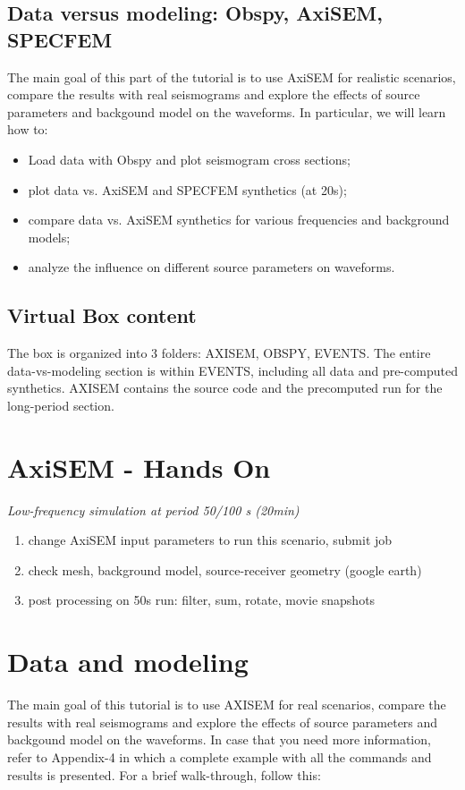 \documentclass{article}
\begin{document}
\subsection{Data versus modeling: Obspy, AxiSEM, SPECFEM}
The main goal of this part of the tutorial is to use AxiSEM for realistic scenarios, compare the 
results with real seismograms and explore the effects of source parameters and 
backgound model on the waveforms. In particular, we will learn how to:

\begin{itemize}
    \item Load data with Obspy and plot seismogram cross sections;
    \item plot data vs. AxiSEM and SPECFEM synthetics (at 20s);
    \item compare data vs. AxiSEM synthetics for various frequencies and background
          models;
    \item analyze the influence on different source parameters on waveforms.
\end{itemize}


\subsection{Virtual Box content}
The box is organized into 3 folders: AXISEM, OBSPY, EVENTS. The entire
data-vs-modeling section is within EVENTS, including all data and pre-computed
synthetics. AXISEM contains the source code and the precomputed run
for the long-period section.



\section{AxiSEM - Hands On}
\emph{Low-frequency simulation at period 50/100 s (20min)}
\begin{enumerate}
    \item change AxiSEM input parameters to run this scenario, submit job
    \item check mesh, background model, source-receiver geometry (google earth)
    \item post processing on 50s run: filter, sum, rotate, movie snapshots
\end{enumerate}

\newpage




\section{Data and modeling}
The main goal of this tutorial is to use AXISEM for real scenarios, 
compare the results with real seismograms and explore the effects of source parameters and backgound model on the waveforms. 
In case that you need more information, 
refer to Appendix-4 in which a complete example with all the commands and results is presented.
For a brief walk-through, follow this:
\end{document}
